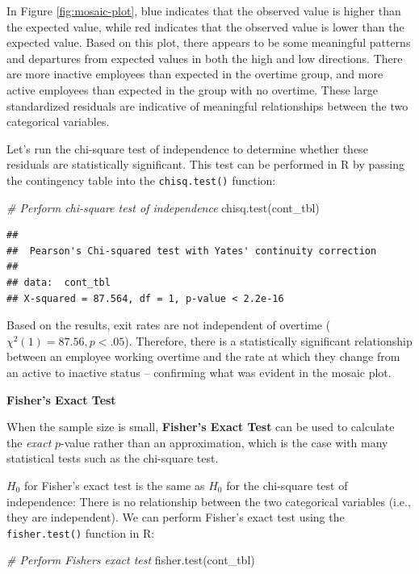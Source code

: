 \documentclass[
]{book}
\newenvironment{Shaded}{\begin{snugshade}}{\end{snugshade}}
\newcommand{\CommentTok}[1]{\textcolor[rgb]{0.56,0.35,0.01}{\textit{#1}}}
\newcommand{\FunctionTok}[1]{\textcolor[rgb]{0.00,0.00,0.00}{#1}}
\newcommand{\NormalTok}[1]{#1}
\begin{document}
In Figure \ref{fig:mosaic-plot}, blue indicates that the observed value is higher than the expected value, while red indicates that the observed value is lower than the expected value. Based on this plot, there appears to be some meaningful patterns and departures from expected values in both the high and low directions. There are more inactive employees than expected in the overtime group, and more active employees than expected in the group with no overtime. These large standardized residuals are indicative of meaningful relationships between the two categorical variables.

Let's run the chi-square test of independence to determine whether these residuals are statistically significant. This test can be performed in R by passing the contingency table into the \texttt{chisq.test()} function:

\begin{Shaded}
\begin{Highlighting}[]
\CommentTok{\# Perform chi{-}square test of independence}
\FunctionTok{chisq.test}\NormalTok{(cont\_tbl)}
\end{Highlighting}
\end{Shaded}

\begin{verbatim}
## 
##  Pearson's Chi-squared test with Yates' continuity correction
## 
## data:  cont_tbl
## X-squared = 87.564, df = 1, p-value < 2.2e-16
\end{verbatim}

Based on the results, exit rates are not independent of overtime (\({\chi}^2(1) = 87.56, p < .05\)). Therefore, there is a statistically significant relationship between an employee working overtime and the rate at which they change from an active to inactive status -- confirming what was evident in the mosaic plot.

\textbf{Fisher's Exact Test}

When the sample size is small, \textbf{Fisher's Exact Test} can be used to calculate the \emph{exact} \(p\)-value rather than an approximation, which is the case with many statistical tests such as the chi-square test.

\(H_0\) for Fisher's exact test is the same as \(H_0\) for the chi-square test of independence: There is no relationship between the two categorical variables (i.e., they are independent). We can perform Fisher's exact test using the \texttt{fisher.test()} function in R:

\begin{Shaded}
\begin{Highlighting}[]
\CommentTok{\# Perform Fisher\textquotesingle{}s exact test}
\FunctionTok{fisher.test}\NormalTok{(cont\_tbl)}
\end{Highlighting}
\end{Shaded}
\end{document}
